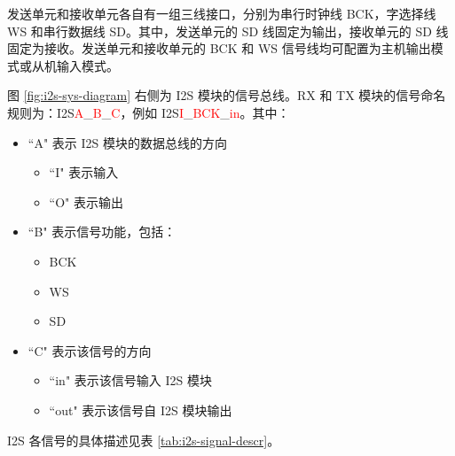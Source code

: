 \documentclass[main\_\_CN.tex]{subfiles}
\begin{document}
发送单元和接收单元各自有一组三线接口，分别为串行时钟线 BCK，字选择线 WS 和串行数据线 SD。其中，发送单元的 SD 线固定为输出，接收单元的 SD 线固定为接收。发送单元和接收单元的 BCK 和 WS 信号线均可配置为主机输出模式或从机输入模式。



图 \ref{fig:i2s-sys-diagram} 右侧为 I2S 模块的信号总线。RX 和 TX 模块的信号命名规则为：I2S\textcolor{red}{A}\_\textcolor{red}{B}\_\textcolor{red}{C}，例如 I2S\textcolor{red}{I}\_\textcolor{red}{BCK}\_\textcolor{red}{in}。其中：

\begin{itemize}
    \item ``A" 表示 I2S 模块的数据总线的方向
    \begin{itemize}
        \item ``I" 表示输入
        \item ``O" 表示输出
    \end{itemize}
    \item ``B" 表示信号功能，包括：
    \begin{itemize}
        \item BCK
        \item WS
        \item SD
    \end{itemize}
    \item ``C" 表示该信号的方向
    \begin{itemize}
        \item ``in" 表示该信号输入 I2S 模块
        \item ``out" 表示该信号自 I2S 模块输出
    \end{itemize}
\end{itemize}

I2S 各信号的具体描述见表 \ref{tab:i2s-signal-descr}。
\end{document}
